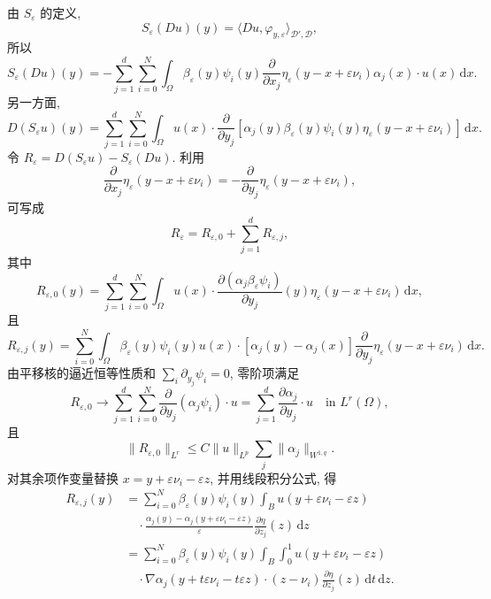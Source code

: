 \begin{Proof}
由 $S_\varepsilon$ 的定义,
\[
 S_\varepsilon(Du)(y)=\langle Du,\varphi_{y,\varepsilon}\rangle_{\mathcal D',\mathcal D},
\]
所以
\[
 S_\varepsilon(Du)(y)
 =-\sum_{j=1}^d\sum_{i=0}^N
 \int_\Omega\beta_\varepsilon(y)\psi_i(y)
 \frac{\partial}{\partial x_j}\eta_\varepsilon(y-x+\varepsilon\nu_i)
 \alpha_j(x)\cdot u(x)\,\mathrm dx.
\]
另一方面,
\[
 D(S_\varepsilon u)(y)
 =\sum_{j=1}^d\sum_{i=0}^N\int_\Omega u(x)\cdot
 \frac{\partial}{\partial y_j}
 [\alpha_j(y)\beta_\varepsilon(y)\psi_i(y)
 \eta_\varepsilon(y-x+\varepsilon\nu_i)]\,\mathrm dx.
\]
令 $R_\varepsilon=D(S_\varepsilon u)-S_\varepsilon(Du)$. 利用
\[
 \frac{\partial}{\partial x_j}\eta_\varepsilon(y-x+\varepsilon\nu_i)
 =-\frac{\partial}{\partial y_j}\eta_\varepsilon(y-x+\varepsilon\nu_i),
\]
可写成
\[
 R_\varepsilon=R_{\varepsilon,0}+\sum_{j=1}^dR_{\varepsilon,j},
\]
其中
\[
 R_{\varepsilon,0}(y)
 =\sum_{j=1}^d\sum_{i=0}^N\int_\Omega
 u(x)\cdot\frac{\partial(\alpha_j\beta_\varepsilon\psi_i)}{\partial y_j}(y)
 \eta_\varepsilon(y-x+\varepsilon\nu_i)\,\mathrm dx,
\]
且
\[
 R_{\varepsilon,j}(y)
 =\sum_{i=0}^N\int_\Omega\beta_\varepsilon(y)\psi_i(y)u(x)
 \cdot[\alpha_j(y)-\alpha_j(x)]
 \frac{\partial}{\partial y_j}\eta_\varepsilon(y-x+\varepsilon\nu_i)\,\mathrm dx.
\]
由平移核的逼近恒等性质和 $\sum_i\partial_{y_j}\psi_i=0$, 零阶项满足
\begin{equation}
 R_{\varepsilon,0}\longrightarrow
 \sum_{j=1}^d\sum_{i=0}^N\frac{\partial}{\partial y_j}(\alpha_j\psi_i)\cdot u
 =\sum_{j=1}^d\frac{\partial\alpha_j}{\partial y_j}\cdot u
 \quad\text{in }L^r(\Omega),
 \label{eq:chap3-commutator-zero-order-limit}
\end{equation}
且
\begin{equation}
 \|R_{\varepsilon,0}\|_{L^r}\leq C\|u\|_{L^p}
 \sum_j\|\alpha_j\|_{W^{1,q}}.
 \label{eq:chap3-commutator-zero-order-bound}
\end{equation}
对其余项作变量替换 $x=y+\varepsilon\nu_i-\varepsilon z$, 并用线段积分公式, 得
\[
\begin{aligned}
 R_{\varepsilon,j}(y)
 &=\sum_{i=0}^N\beta_\varepsilon(y)\psi_i(y)
 \int_Bu(y+\varepsilon\nu_i-\varepsilon z)\\
 &\quad\cdot\frac{\alpha_j(y)-\alpha_j(y+\varepsilon\nu_i-\varepsilon z)}{\varepsilon}
 \frac{\partial\eta}{\partial z_j}(z)\,\mathrm dz\\
 &=\sum_{i=0}^N\beta_\varepsilon(y)\psi_i(y)
 \int_B\int_0^1u(y+\varepsilon\nu_i-\varepsilon z)\\
 &\quad\cdot\nabla\alpha_j(y+t\varepsilon\nu_i-t\varepsilon z)
 \cdot(z-\nu_i)\frac{\partial\eta}{\partial z_j}(z)\,\mathrm dt\,\mathrm dz.

\end{aligned}\]
\end{Proof}
